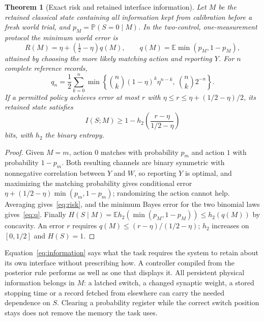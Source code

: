 \documentclass[11pt,a4paper]{article}
\newtheorem{theorem}[definition]{Theorem}
\newcommand{\E}{\mathbb E}
\newcommand{\Prb}{\mathbb P}
\begin{document}
\begin{theorem}[Exact risk and retained interface information]\label{thm:risk}
Let $M$ be the retained classical state containing all information kept from calibration before a fresh world trial, and $p_M=\Prb(S=0\mid M)$. In the two-control, one-measurement protocol the minimum world error is
\begin{equation}\label{eq:risk}
 R(M)=\eta+(\tfrac12-\eta)q(M),\qquad
 q(M)=\E\min(p_M,1-p_M),
\end{equation}
attained by choosing the more likely matching action and reporting $Y$. For $n$ complete reference records,
\begin{equation}\label{eq:q}
 q_n=\frac12\sum_{k=0}^n
 \min\!\left\{\binom nk(1-\eta)^k\eta^{n-k},\ \binom nk2^{-n}\right\}.
\end{equation}
If a permitted policy achieves error at most $r$ with $\eta\le r\le\eta+(1/2-\eta)/2$, its retained state satisfies
\begin{equation}\label{eq:information}
 I(S;M)\ge 1-h_2\!\left(\frac{r-\eta}{1/2-\eta}\right)
\end{equation}
bits, with $h_2$ the binary entropy.
\end{theorem}
\begin{proof}
Given $M=m$, action $0$ matches with probability $p_m$ and action $1$ with probability $1-p_m$. Both resulting channels are binary symmetric with nonnegative correlation between $Y$ and $W$, so reporting $Y$ is optimal, and maximizing the matching probability gives conditional error $\eta+(1/2-\eta)\min(p_m,1-p_m)$; randomizing the action cannot help. Averaging gives~\eqref{eq:risk}, and the minimum Bayes error for the two binomial laws gives~\eqref{eq:q}. Finally $H(S\mid M)=\E h_2(\min(p_M,1-p_M))\le h_2(q(M))$ by concavity. An error $r$ requires $q(M)\le(r-\eta)/(1/2-\eta)$; $h_2$ increases on $[0,1/2]$ and $H(S)=1$.
\end{proof}

Equation~\eqref{eq:information} says what the task requires the system to retain about its own interface without prescribing how. A controller compiled from the posterior rule performs as well as one that displays it. All persistent physical information belongs in $M$: a latched switch, a changed synaptic weight, a stored stopping time or a record fetched from elsewhere can carry the needed dependence on $S$. Clearing a probability register while the correct switch position stays does not remove the memory the task uses.
\end{document}
